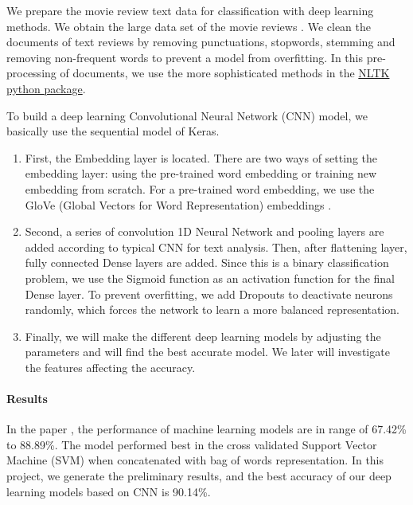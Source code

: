 \documentclass[11pt]{article}
\begin{document}
We prepare the movie review text data for classification with deep learning methods. We obtain the large data set of the movie reviews \cite{Stanford_movie_review_paper} \cite{Stanford_movie_review_dataset}. 
%
We clean the documents of text reviews by removing punctuations, stopwords, stemming and removing non-frequent words to prevent a model from overfitting. In this pre-processing of documents, we use the more sophisticated methods in the \href{https://www.nltk.org/}{NLTK python package}. 

To build a deep learning Convolutional Neural Network (CNN) model, we basically use the sequential model of Keras. 

\begin{enumerate}
	\item First, the Embedding layer is located. There are two ways of setting the embedding layer: using the pre-trained word embedding or training new embedding from scratch. For a pre-trained word embedding, we use the GloVe (Global Vectors for Word Representation) embeddings \cite{glove}.

\item Second, a series of convolution 1D Neural Network and pooling layers are added according to typical CNN for text analysis. Then, after flattening layer, fully connected Dense layers are added. Since this is a binary classification problem, we use the Sigmoid function as an activation function for the final Dense layer. To prevent overfitting, we add Dropouts to deactivate neurons randomly, which forces the network to learn a more balanced representation. 

\item Finally, we will make the different deep learning models by adjusting the parameters and will find the best accurate model. We later will investigate the features affecting the accuracy.
\end{enumerate}

\paragraph*{Results}
In the paper \cite{Stanford_movie_review_paper}, the performance of machine learning models are in range of 67.42\% to 88.89\%. The model performed best in the cross validated Support Vector Machine (SVM) when concatenated with bag of words representation. In this project, we generate the preliminary results, and the best accuracy of our deep learning models based on CNN is 90.14\%. 
\end{document}
